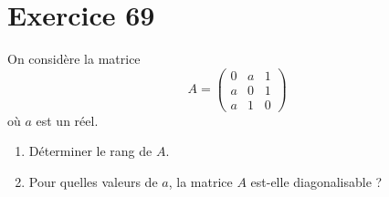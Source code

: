 \documentclass[a4paper,12pt,oneside]{book}
\newenvironment{statement}{\begin{statementbox}}{\end{statementbox}}
\begin{document}
\section*{Exercice 69}

\begin{statement}
	On considère la matrice 
	\[
	A = \begin{pmatrix}
		0 & a & 1 \\
		a & 0 & 1 \\
		a & 1 & 0
	\end{pmatrix}
	\]
	où \(a\) est un réel.
	\begin{enumerate}
		\item Déterminer le rang de \(A\).
		\item Pour quelles valeurs de \(a\), la matrice \(A\) est-elle diagonalisable ?
	\end{enumerate}
\end{statement}
\end{document}
